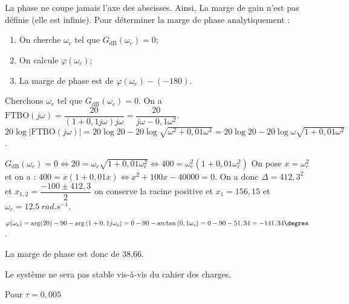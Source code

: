 \ifprof
\begin{corrige}~\\
\end{corrige}
\else
\fi

\ifprof
\begin{corrige}~\\
La phase ne coupe jamais l'axe des abscisses. Ainsi, La marge de gain n'est pas définie (elle est infinie).
Pour déterminer la marge de phase analytiquement :
\begin{enumerate}
\item On cherche $\omega_c$ tel que $G_{\text{dB}}(\omega_c)=0$;
\item On calcule $\varphi(\omega_c)$;
\item La marge de phase est de $\varphi(\omega_c) -(-180)$.
\end{enumerate}

Cherchons $\omega_c$ tel que $G_{\text{dB}}(\omega_c)=0$. 
On a ${\text{FTBO}}(j\omega )
=\dfrac{20}{(1+0,1j\omega)j\omega}
=\dfrac{20}{j\omega-0,1\omega^2}$. 
$20\log |{\text{FTBO}}(j\omega )| 
= 20\log 20 - 20\log \sqrt{\omega^2+0,01\omega^4}
= 20\log 20 - 20\log \omega\sqrt{1+0,01\omega^2}$.

 $G_{\text{dB}}(\omega_c)=0 
\Leftrightarrow   20 =\omega_c\sqrt{1+0,01\omega_c^2} 
\Leftrightarrow   400 =\omega_c^2 \left(1+0,01\omega_c^2\right)$
On pose $x=\omega_c^2$ et on a :
$400 =x \left(1+0,01x\right)\Leftrightarrow x^2+100x-40000=0$. 
On a donc $\Delta = 412,3^2$ et $x_{1,2}=\dfrac{-100\pm412,3}{2}$ on conserve la racine positive et  $x_1=156,15$ et $\omega_c=\SI{12,5}{rad.s^{-1}}$.

$\varphi(\omega_c)=\arg(20)-90 -\arg\left(1+0,1j\omega_c \right)
=0- 90 -\arctan\left( 0,1\omega_c \right)
=0-90-51,34=-141,34\degres$.

La marge de phase est donc de 38,66\degres.
\end{corrige}
\else
\fi

\ifprof
\begin{corrige}
Le système ne sera pas stable vis-à-vis du cahier des charges.
\end{corrige}
\else
\fi

\ifprof

Pour $\tau  = 0,005$


